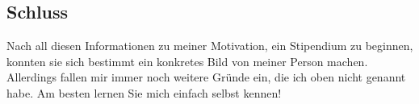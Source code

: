 \documentclass{scrartcl}
\begin{document}
\subsection*{Schluss}
Nach all diesen Informationen zu meiner Motivation, ein Stipendium zu beginnen, konnten sie
sich bestimmt ein konkretes Bild von meiner Person machen. Allerdings fallen mir immer noch
weitere Gründe ein, die ich oben nicht genannt habe. Am besten lernen Sie mich einfach selbst kennen!
\end{document}
